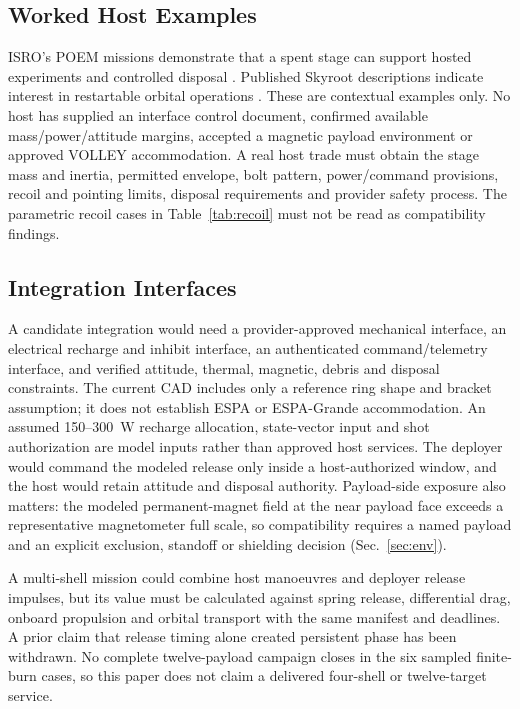 \documentclass[conference]{IEEEtran}
\begin{document}
\subsection{Worked Host Examples}
ISRO's POEM missions demonstrate that a spent stage can support hosted experiments and controlled disposal \cite{poem3,poem4}. Published Skyroot descriptions indicate interest in restartable orbital operations \cite{oam,spacenews}. These are contextual examples only. No host has supplied an interface control document, confirmed available mass/power/attitude margins, accepted a magnetic payload environment or approved VOLLEY accommodation. A real host trade must obtain the stage mass and inertia, permitted envelope, bolt pattern, power/command provisions, recoil and pointing limits, disposal requirements and provider safety process. The parametric recoil cases in Table~\ref{tab:recoil} must not be read as compatibility findings.

\subsection{Integration Interfaces}
A candidate integration would need a provider-approved mechanical interface, an electrical recharge and inhibit interface, an authenticated command/telemetry interface, and verified attitude, thermal, magnetic, debris and disposal constraints. The current CAD includes only a reference ring shape and bracket assumption; it does not establish ESPA or ESPA-Grande accommodation. An assumed 150--300~W recharge allocation, state-vector input and shot authorization are model inputs rather than approved host services. The deployer would command the modeled release only inside a host-authorized window, and the host would retain attitude and disposal authority. Payload-side exposure also matters: the modeled permanent-magnet field at the near payload face exceeds a representative magnetometer full scale, so compatibility requires a named payload and an explicit exclusion, standoff or shielding decision (Sec.~\ref{sec:env}).

A multi-shell mission could combine host manoeuvres and deployer release impulses, but its value must be calculated against spring release, differential drag, onboard propulsion and orbital transport with the same manifest and deadlines. A prior claim that release timing alone created persistent phase has been withdrawn. No complete twelve-payload campaign closes in the six sampled finite-burn cases, so this paper does not claim a delivered four-shell or twelve-target service.
\end{document}
